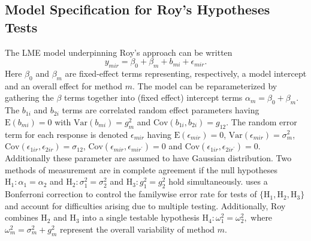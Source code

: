 \documentclass[12pt, a4paper]{report}
\theoremstyle{plain}
\theoremstyle{definition}
\theoremstyle{remark}
\begin{document}
\subsection*{Model Specification for Roy's Hypotheses Tests}
The LME model underpinning Roy's approach can be written
\begin{equation}\label{ARoy2009-model}
y_{mir} = \beta_{0} + \beta_{m} + b_{mi} + \epsilon_{mir}.
\end{equation}
Here $\beta_0$ and $\beta_m$ are fixed-effect terms representing, respectively, a model intercept and an overall effect for method $m.$ The model can be reparameterized by gathering the $\beta$ terms together into (fixed effect) intercept terms $\alpha_m=\beta_0+\beta_m.$ The $b_{1i}$ and $b_{2i}$ terms are correlated random effect parameters having $\mathrm{E}(b_{mi})=0$ with $\mathrm{Var}(b_{mi})=g^2_m$ and $\mathrm{Cov}(b_{1i}, b_{2 i})=g_{12}.$ The random error term for each response is denoted $\epsilon_{mir}$ having $\mathrm{E}(\epsilon_{mir})=0$, $\mathrm{Var}(\epsilon_{mir})=\sigma^2_m$, $\mathrm{Cov}(\epsilon_{1ir}, \epsilon_{2 ir})=\sigma_{12}$, $\mathrm{Cov}(\epsilon_{mir}, \epsilon_{mir^\prime})= 0$ and $\mathrm{Cov}(\epsilon_{1ir}, \epsilon_{2 ir^\prime})= 0.$ Additionally these parameter are assumed to have Gaussian distribution. Two methods of measurement are in complete agreement if the null hypotheses $\mathrm{H}_1\colon \alpha_1 = \alpha_2$ and $\mathrm{H}_2\colon \sigma^2_1 = \sigma^2_2 $ and $\mathrm{H}_3\colon g^2_1= g^2_2$ hold simultaneously. \citet{ARoy2009} uses a Bonferroni correction to control the familywise error rate for tests of $\{\mathrm{H}_1, \mathrm{H}_2, \mathrm{H}_3\}$ and account for difficulties arising due to multiple testing. Additionally, Roy combines $\mathrm{H}_2$ and $\mathrm{H}_3$ into a single testable hypothesis $\mathrm{H}_4\colon \omega^2_1=\omega^2_2,$ where $\omega^2_m = \sigma^2_m + g^2_m$ represent the overall variability of method $m.$

	
	
	
\end{document}
